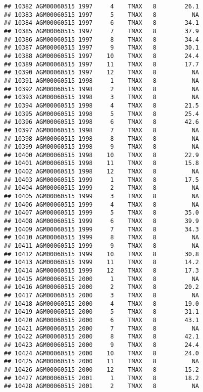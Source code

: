 \documentclass{article}\usepackage[]{graphicx}\usepackage[]{color}
\makeatletter
\newenvironment{kframe}{%
 \def\at@end@of@kframe{}%
 \ifinner\ifhmode%
  \def\at@end@of@kframe{\end{minipage}}%
  \begin{minipage}{\columnwidth}%
 \fi\fi%
 \def\FrameCommand##1{\hskip\@totalleftmargin \hskip-\fboxsep
 \colorbox{shadecolor}{##1}\hskip-\fboxsep
     \hskip-\linewidth \hskip-\@totalleftmargin \hskip\columnwidth}%
 \MakeFramed {\advance\hsize-\width
   \@totalleftmargin\z@ \linewidth\hsize
   \@setminipage}}%
 {\par\unskip\endMakeFramed%
 \at@end@of@kframe}
\newenvironment{knitrout}{}{} %
\makeatother
\begin{document}
\begin{knitrout}
\begin{kframe}
\begin{verbatim}
## 10382 AGM00060515 1997     4    TMAX   8        26.1
## 10383 AGM00060515 1997     5    TMAX   8          NA
## 10384 AGM00060515 1997     6    TMAX   8        34.1
## 10385 AGM00060515 1997     7    TMAX   8        37.9
## 10386 AGM00060515 1997     8    TMAX   8        34.4
## 10387 AGM00060515 1997     9    TMAX   8        30.1
## 10388 AGM00060515 1997    10    TMAX   8        24.4
## 10389 AGM00060515 1997    11    TMAX   8        17.7
## 10390 AGM00060515 1997    12    TMAX   8          NA
## 10391 AGM00060515 1998     1    TMAX   8          NA
## 10392 AGM00060515 1998     2    TMAX   8          NA
## 10393 AGM00060515 1998     3    TMAX   8          NA
## 10394 AGM00060515 1998     4    TMAX   8        21.5
## 10395 AGM00060515 1998     5    TMAX   8        25.4
## 10396 AGM00060515 1998     6    TMAX   8        42.6
## 10397 AGM00060515 1998     7    TMAX   8          NA
## 10398 AGM00060515 1998     8    TMAX   8          NA
## 10399 AGM00060515 1998     9    TMAX   8          NA
## 10400 AGM00060515 1998    10    TMAX   8        22.9
## 10401 AGM00060515 1998    11    TMAX   8        15.8
## 10402 AGM00060515 1998    12    TMAX   8          NA
## 10403 AGM00060515 1999     1    TMAX   8        17.5
## 10404 AGM00060515 1999     2    TMAX   8          NA
## 10405 AGM00060515 1999     3    TMAX   8          NA
## 10406 AGM00060515 1999     4    TMAX   8          NA
## 10407 AGM00060515 1999     5    TMAX   8        35.0
## 10408 AGM00060515 1999     6    TMAX   8        39.9
## 10409 AGM00060515 1999     7    TMAX   8        34.3
## 10410 AGM00060515 1999     8    TMAX   8          NA
## 10411 AGM00060515 1999     9    TMAX   8          NA
## 10412 AGM00060515 1999    10    TMAX   8        30.8
## 10413 AGM00060515 1999    11    TMAX   8        14.2
## 10414 AGM00060515 1999    12    TMAX   8        17.3
## 10415 AGM00060515 2000     1    TMAX   8          NA
## 10416 AGM00060515 2000     2    TMAX   8        20.2
## 10417 AGM00060515 2000     3    TMAX   8          NA
## 10418 AGM00060515 2000     4    TMAX   8        19.0
## 10419 AGM00060515 2000     5    TMAX   8        31.1
## 10420 AGM00060515 2000     6    TMAX   8        43.1
## 10421 AGM00060515 2000     7    TMAX   8          NA
## 10422 AGM00060515 2000     8    TMAX   8        42.1
## 10423 AGM00060515 2000     9    TMAX   8        24.4
## 10424 AGM00060515 2000    10    TMAX   8        24.0
## 10425 AGM00060515 2000    11    TMAX   8          NA
## 10426 AGM00060515 2000    12    TMAX   8        15.2
## 10427 AGM00060515 2001     1    TMAX   8        18.2
## 10428 AGM00060515 2001     2    TMAX   8          NA

\end{verbatim}
\end{kframe}
\end{knitrout}
\end{document}
